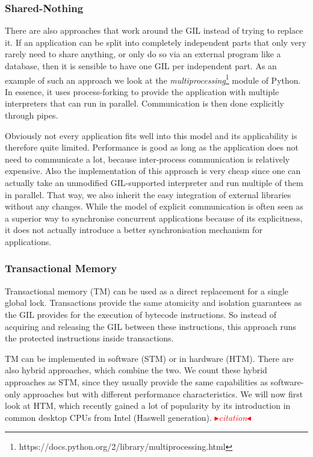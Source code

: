 \documentclass{sigplanconf}
\newcommand{\mynote}[2]{%
  \textcolor{red}{%
    \fbox{\bfseries\sffamily\scriptsize#1}%
    {\small$\blacktriangleright$\textsf{\emph{#2}}$\blacktriangleleft$}%
  }%
}
\newcommand\cfbolz[1]{\mynote{Carl Friedrich}{#1}}
\begin{document}
\subsubsection{Shared-Nothing}

There are also approaches that work around the GIL instead of trying
to replace it. If an application can be split into completely
independent parts that only very rarely need to share anything, or
only do so via an external program like a database, then it is
sensible to have one GIL per independent part. As an example of such
an approach we look at the
\emph{multiprocessing}\footnote{https://docs.python.org/2/library/multiprocessing.html}
module of Python. In essence, it uses process-forking to provide the
application with multiple interpreters that can run in parallel.
Communication is then done explicitly through pipes.

Obviously not every application fits well into this model and its
applicability is therefore quite limited. Performance is good as
long as the application does not need to communicate a lot, because
inter-process communication is relatively expensive. Also the
implementation of this approach is very cheap since one can
actually take an unmodified GIL-supported interpreter and run
multiple of them in parallel. That way, we also inherit the
easy integration of external libraries without any changes.
While the model of explicit communication is often seen as a
superior way to synchronise concurrent applications because
of its explicitness, it does not actually introduce a better
synchronisation mechanism for applications.



\subsubsection{Transactional Memory}
Transactional memory (TM) can be used as a direct replacement for a
single global lock. Transactions provide the same atomicity and
isolation guarantees as the GIL provides for the execution of bytecode
instructions. So instead of acquiring and releasing the GIL between
these instructions, this approach runs the protected instructions
inside transactions.

TM can be implemented in software (STM) or in hardware (HTM). There
are also hybrid approaches, which combine the two. We count these
hybrid approaches as STM, since they usually provide the same
capabilities as software-only approaches but with different
performance characteristics. We will now first look at HTM, which
recently gained a lot of popularity by its introduction in common
desktop CPUs from Intel (Haswell generation).\cfbolz{citation}
\end{document}
